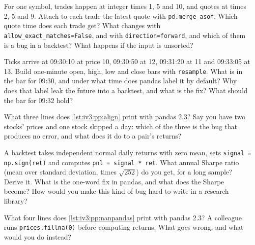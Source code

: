 \begin{question}\label{iq:iv3:python-and-pandas:20}
For one symbol, trades happen at integer times 1, 5 and 10, and quotes at times 2, 5 and 9. Attach to each trade the latest quote with \texttt{pd.merge\_asof}. Which quote time does each trade get? What changes with \texttt{allow\_exact\_matches=False}, and with \texttt{direction=\textquotesingle forward\textquotesingle}, and which of them is a bug in a backtest? What happens if the input is unsorted?
\end{question}

\begin{question}\label{iq:iv3:python-and-pandas:21}
Ticks arrive at 09:30:10 at price 10, 09:30:50 at 12, 09:31:20 at 11 and 09:33:05 at 13. Build one-minute open, high, low and close bars with \texttt{resample}. What is in the bar for 09:30, and under what time does pandas label it by default? Why does that label leak the future into a backtest, and what is the fix? What should the bar for 09:32 hold?
\end{question}

\begin{question}\label{iq:iv3:python-and-pandas:22}
What three lines does \cref{lst:iv3:pp:align} print with pandas 2.3? Say you have two stocks' prices and one stock skipped a day: which of the three is the bug that produces no error, and what does it do to a pair's returns?
\label{lst:iv3:pp:align}
\end{question}

\begin{question}\label{iq:iv3:python-and-pandas:23}
A backtest takes independent normal daily returns with zero mean, sets \texttt{signal = np.sign(ret)} and computes \texttt{pnl = signal * ret}. What annual Sharpe ratio (mean over standard deviation, times $\sqrt{252}$) do you get, for a long sample? Derive it. What is the one-word fix in pandas, and what does the Sharpe become? How would you make this kind of bug hard to write in a research library?
\end{question}

\begin{question}\label{iq:iv3:python-and-pandas:24}
What four lines does \cref{lst:iv3:pp:nanpandas} print with pandas 2.3? A colleague runs \texttt{prices.fillna(0)} before computing returns. What goes wrong, and what would you do instead?
\label{lst:iv3:pp:nanpandas}
\end{question}

